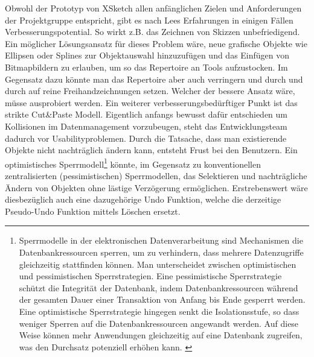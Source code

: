 \medskip Obwohl der Prototyp von XSketch allen anfänglichen Zielen und Anforderungen der Projektgruppe entspricht, gibt es nach Lees Erfahrungen in einigen Fällen Verbesserungspotential. So wirkt z.B. das Zeichnen von Skizzen unbefriedigend. Ein möglicher Lösungsansatz für dieses Problem wäre, neue grafische Objekte wie Ellipsen oder Splines zur Objektauswahl hinzuzufügen und das Einfügen von Bitmapbildern zu erlauben, um so das Repertoire an Tools aufzustocken.  Im Gegensatz dazu könnte man das Repertoire aber auch verringern und durch und durch auf reine Freihandzeichnungen setzen. Welcher der bessere Ansatz wäre, müsse ausprobiert werden.
Ein weiterer verbesserungsbedürftiger Punkt ist das strikte Cut\&Paste Modell. Eigentlich anfangs bewusst dafür entschieden um Kollisionen im Datenmanagement vorzubeugen, steht das Entwicklungsteam dadurch vor Usabilityproblemen. Durch die Tatsache, dass man existierende Objekte nicht nachträglich ändern kann, entsteht Frust bei den Benutzern. Ein optimistisches Sperrmodell\footnote{Sperrmodelle in der elektronischen Datenverarbeitung sind Mechanismen die Datenbankressourcen sperren, um zu verhindern, dass mehrere Datenzugriffe gleichzeitig stattfinden können. Man unterscheidet zwischen optimistischen und pessimistischen Sperrstrategien. Eine pessimistische Sperrstrategie schützt die Integrität der Datenbank, indem Datenbankressourcen während der gesamten Dauer einer Transaktion von Anfang bis Ende gesperrt werden. Eine optimistische Sperrstrategie hingegen senkt die Isolationsstufe, so dass weniger Sperren auf die Datenbankressourcen angewandt werden. Auf diese Weise können mehr Anwendungen gleichzeitig auf eine Datenbank zugreifen, was den Durchsatz potenziell erhöhen kann. \cite{IBM:1996:Online}} könnte, im Gegensatz zu konventionellen zentralisierten (pessimistischen) Sperrmodellen, das Selektieren und nachträgliche Ändern von Objekten ohne lästige Verzögerung ermöglichen. Erstrebenswert wäre diesbezüglich auch eine dazugehörige Undo Funktion, welche die derzeitige Pseudo-Undo Funktion mittels Löschen ersetzt.
